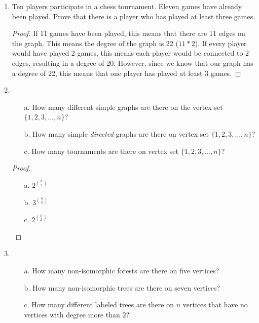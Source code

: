 \documentclass[11pt]{article}
\begin{document}
{\raggedright}
\newcommand\NAME{Ojas Chaturvedi}  %

\begin{enumerate}

    \item Ten players participate in a chess tournament. Eleven games have already been played. Prove that there is a player who has played at least three games.

        \begin{proof}
            If 11 games have been played, this means that there are 11 edges on the graph. This means the degree of the graph is 22 ($11 * 2$). If every player would have played 2 games, this means each player would be connected to 2 edges, resulting in a degree of 20. However, since we know that our graph has a degree of 22, this means that one player has played at least 3 games.
        \end{proof}

    \item
        \begin{itemize}
            \item[a.] How many different simple graphs are there on the vertex set $\{1, 2, 3, \dots, n\}$?
            \item[b.] How many simple \emph{directed} graphs are there on vertex set $\{1, 2, 3, \dots, n\}$?
            \item[c.] How many tournaments are there on vertex set $\{1, 2, 3, \dots, n\}$?
        \end{itemize}

        \begin{proof}
            \begin{enumerate}
                \item[a.] $2^{n \choose 2}$
                \item[b.] $3^{n \choose 2}$
                \item[c.] $2^{n \choose 2}$
            \end{enumerate}
        \end{proof}

    \item
        \begin{itemize}
            \item[a.] How many non-isomorphic forests are there on five vertices?
            \item[b.] How many non-isomorphic trees are there on seven vertices?
            \item[c.] How many different labeled trees are there on $n$ vertices that have no vertices with degree more than 2?
        \end{itemize}


\end{enumerate}
\end{document}
